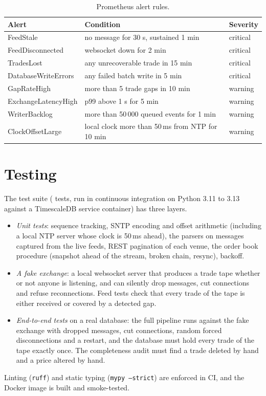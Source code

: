 \documentclass[11pt,a4paper]{article}
\newcommand{\code}[1]{\texttt{#1}}
\newcommand{\ms}{\,ms}
\begin{document}
\begin{table}[ht]
\centering
\caption{Prometheus alert rules.}
\label{tab:alerts}
\small
\begin{tabular}{@{}lll@{}}
\toprule
Alert & Condition & Severity \\
\midrule
FeedStale & no message for 30 s, sustained 1 min & critical \\
FeedDisconnected & websocket down for 2 min & critical \\
TradesLost & any unrecoverable trade in 15 min & critical \\
DatabaseWriteErrors & any failed batch write in 5 min & critical \\
GapRateHigh & more than 5 trade gaps in 10 min & warning \\
ExchangeLatencyHigh & p99 above 1 s for 5 min & warning \\
WriterBacklog & more than 50\,000 queued events for 1 min & warning \\
ClockOffsetLarge & local clock more than 50\ms{} from NTP for 10 min & warning \\
\bottomrule
\end{tabular}
\end{table}

\section{Testing}\label{sec:testing}

The test suite (\TestCount{} tests, run in continuous integration on Python 3.11 to 3.13 against a TimescaleDB
service container) has three layers.
\begin{itemize}[nosep]
  \item \emph{Unit tests}: sequence tracking, SNTP encoding and offset arithmetic (including a local NTP server
        whose clock is 50\ms{} ahead), the parsers on messages captured from the live feeds, REST pagination of
        each venue, the order book procedure (snapshot ahead of the stream, broken chain, resync), backoff.
  \item \emph{A fake exchange}: a local websocket server that produces a trade tape whether or not anyone is
        listening, and can silently drop messages, cut connections and refuse reconnections. Feed tests check
        that every trade of the tape is either received or covered by a detected gap.
  \item \emph{End-to-end tests} on a real database: the full pipeline runs against the fake exchange with
        dropped messages, cut connections, random forced disconnections and a restart, and the database must
        hold every trade of the tape exactly once. The completeness audit must find a trade deleted by hand
        and a price altered by hand.
\end{itemize}
Linting (\code{ruff}) and static typing (\code{mypy --strict}) are enforced in CI, and the Docker image is built
and smoke-tested.
\end{document}
